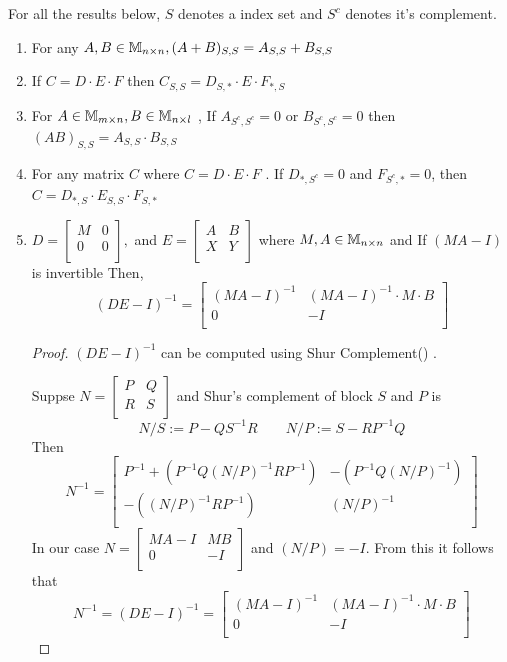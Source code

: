 \begin{HXf}
For all the results below, $S$ denotes a index set and $S^c$ denotes it's complement.
 \begin{enumerate}
  \item For any $A,B \in \mathbb{M}_{n \times n}, (A + B)_{S,S} = A_{S,S} + B_{S,S}$
  \item If $C = D \cdot E \cdot F$ then $C_{S,S} = D_{S,*} \cdot E \cdot F_{*,S}$
  \item For $A \in \mathbb{M}_{m \times n}, B \in \mathbb{M}_{n \times l}$ , If $A_{S^c, S^c} = 0$ or $B_{S^c, S^c} = 0$ then \\ $(AB)_{S,S} = A_{S,S} \cdot B_{S,S}$
  \item For any matrix $C$ where $C = D \cdot E \cdot F$ . If $D_{*, S^c} = 0$ and $F_{S^c, *} = 0$, then $C = D_{*, S} \cdot E_{S,S} \cdot F_{S,*}$
  \item $D = 
\begin{bmatrix}
M & 0 \\
0 & 0 \\
\end{bmatrix},
$ 
and $
E = 
\begin{bmatrix}
A & B \\
X & Y \\
\end{bmatrix}
$
where $M, A \in \mathbb{M}_{n \times n}$ and If $(MA - I)$ is invertible Then,
$$ (DE - I)^{-1} = \begin{bmatrix}
(MA - I)^{-1} & (MA - I)^{-1} \cdot M \cdot B \\
0 & -I \\
\end{bmatrix}
$$
\begin{proof}
 $(DE - I)^{-1}$ can be computed using Shur Complement(\cite{wiki:shur}) . 
 
 Suppse $N =  
\begin{bmatrix}
P & Q \\
R & S \\
\end{bmatrix}
$ and Shur's complement of block $S$ and $P$ is  $$N / S := P - QS^{-1}R \qquad N / P := S - RP^{-1}Q$$
Then $$N^{-1} = 
\begin{bmatrix}
P^{-1} + (P^{-1} Q (N/P)^{-1} R  P^{-1}) & -(P^{-1}Q(N/P)^{-1}) \\[0.3cm]
-((N/P)^{-1}RP^{-1}) & (N/P)^{-1} \\
\end{bmatrix}
$$
In our case $N = 
\begin{bmatrix}
MA - I & MB \\
0 & -I \\
\end{bmatrix}
$ and $(N/P) = -I$. From this it follows that $$N^{-1} = (DE-I)^{-1} = \begin{bmatrix}
(MA - I)^{-1} & (MA - I)^{-1} \cdot M \cdot B \\
0 & -I \\
\end{bmatrix}
$$
\end{proof}

 \end{enumerate}

\end{HXf}

